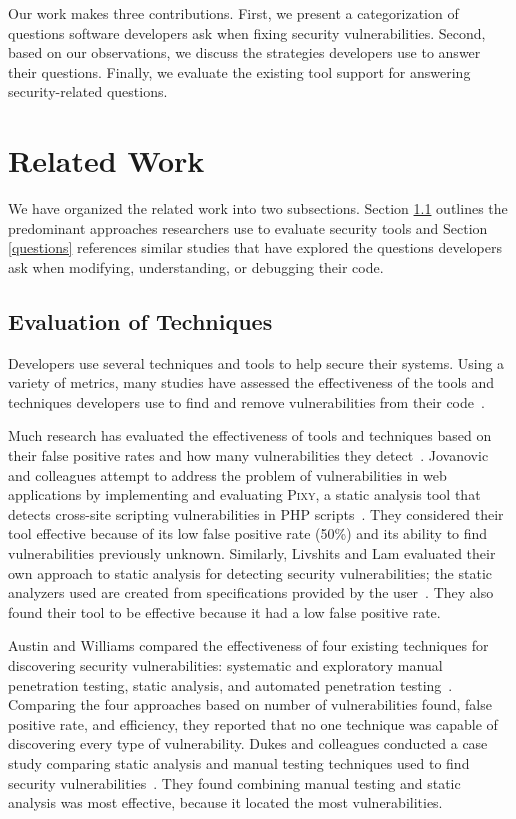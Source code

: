 \documentclass{acm_proc_article-sp}
\begin{document}
Our work makes three contributions. 
First, we present a categorization of questions software developers ask when fixing security vulnerabilities.
Second, based on our observations, we discuss the strategies developers use to answer their questions.
Finally, we evaluate the existing tool support for answering security-related questions.



\section{Related Work}
\label{sec:rw}

We have organized the related work into two subsections. Section \ref{evaluation} outlines the predominant approaches researchers use to evaluate security tools and Section \ref{questions} references similar studies that have explored the questions developers ask when modifying, understanding, or debugging their code.

\subsection{Evaluation of Techniques}
\label{evaluation}
Developers use several techniques and tools to help secure their systems.
Using a variety of metrics, many studies have assessed the effectiveness of the tools and techniques developers use to find and remove vulnerabilities from their code~\cite{martin2005finding, austin2011one, livshits2005finding}.  

Much research has evaluated the effectiveness of tools and techniques based on their false positive rates and how many vulnerabilities they detect~\cite{jovanovic2006pixy, austin2011one, dukes2013case}. 
Jovanovic and colleagues attempt to address the problem of vulnerabilities in web applications by implementing and evaluating \textsc{Pixy}, a static analysis tool that detects cross-site scripting vulnerabilities in PHP scripts~\cite{jovanovic2006pixy}. 
They considered their tool effective because of its low false positive rate (50\%) and its ability to find vulnerabilities previously unknown. 
Similarly, Livshits and Lam evaluated their own approach to static analysis for detecting security vulnerabilities; the static analyzers used are created from specifications provided by the user~\cite{livshits2005finding}. 
They also found their tool to be effective because it had a low false positive rate. 

Austin and Williams compared the effectiveness of four existing techniques for discovering security vulnerabilities: systematic and exploratory manual  penetration testing, static analysis, and automated penetration testing~\cite{austin2011one}. 
Comparing the four approaches based on number of vulnerabilities found, false positive rate, and efficiency, they reported that no one technique was capable of discovering every type of vulnerability. 
Dukes and colleagues conducted a case study comparing static analysis and manual testing techniques used to find security vulnerabilities~\cite{dukes2013case}. 
They found combining manual testing and static analysis was most effective, because it located the most vulnerabilities.
\end{document}
